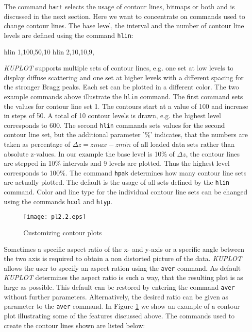The command {\tt hart} selects the usage of contour lines, bitmaps
or both and is discussed in the next section. Here we want to
concentrate on commands used to change contour lines. The base
level, the interval and the number of contour line levels are
defined using the command {\tt hlin}:

\footnotesize
\begin{MacVerbatim}
    hlin 1,100,50,10
    hlin 2,10,10,9,%
\end{MacVerbatim}
\normalsize

{\it KUPLOT} supports multiple sets of contour lines, e.g.  one set
at low levels to display diffuse scattering and one set at higher
levels with a different spacing for the stronger Bragg peaks.  Each
set can be plotted in a different color.  The two example commands
above illustrate the {\tt hlin} command.  The first command sets the
values for contour line set 1.  The contours start at a value of 100
and increase in steps of 50.  A total of 10 contour levels is drawn,
e.g.  the highest level corresponds to 600. The second {\tt hlin}
commands sets values for the second contour line set, but the
additional parameter '\%' indicates, that the numbers are taken as
percentage of $\Delta z = zmax - zmin$ of all loaded data sets
rather than absolute z-values.  In our example the base level is
10\% of $\Delta z$, the contour lines are stepped in 10\% intervals
and 9 levels are plotted. Thus the highest level corresponds to
100\%.  The command {\tt hpak} determines how many contour line sets
are actually plotted.  The default is the usage of all sets defined
by the {\tt hlin} command.  Color and line type for the individual
contour line sets can be changed using the commands {\tt hcol} and
{\tt htyp}.

\begin{figure}[!tbhp]
   \centering
   \texttt{[image: pl2.2.eps]}
   \caption{Customizing contour plots}
   \label{pl2-fig2}
\end{figure}

Sometimes a specific aspect ratio of the x- and y-axis or a specific
angle between the two axis is required to obtain a non distorted
picture of the data.  {\it KUPLOT} allows the user to specify an
aspect ration using the {\tt aver} command.  As default {\it KUPLOT}
determines the aspect ratio is such a way, that the resulting plot
is as large as possible.  This default can be restored by entering
the command {\tt aver} without further parameters. Alternatively,
the desired ratio can be given as parameter to the {\tt aver}
command. In Figure \ref{pl2-fig2} we show an example of a contour
plot illustrating some of the features discussed above. The commands
used to create the contour lines shown are listed below:

